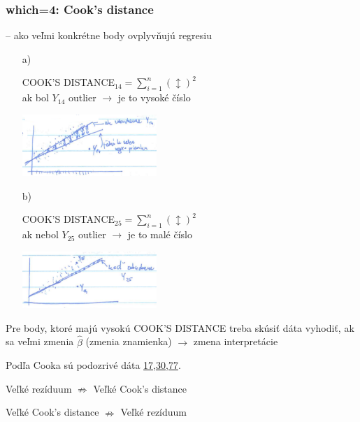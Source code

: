 \documentclass[unknownkeysallowed]{article}
\begin{document}
\subsubsection*{which=4: Cook's distance}
-- ako veľmi konkrétne body ovplyvňujú regresiu
\begin{itemize}
\item[a)]
\begin{multicols}{2}

COOK'S DISTANCE$_{14} = \sum_{i=1}^n(\updownarrow)^2$\\
ak bol $Y_{14}$ outlier $\to$ je to vysoké číslo

\columnbreak

\includegraphics[width=0.4\textwidth]{imgs/obr37.png}

\end{multicols}

\item[b)]
\begin{multicols}{2}

COOK'S DISTANCE$_{25} = \sum_{i=1}^n(\updownarrow)^2$\\
ak nebol $Y_{25}$ outlier $\to$ je to malé číslo

\columnbreak

\includegraphics[width=0.4\textwidth]{imgs/obr38.png}

\end{multicols}

\end{itemize}

Pre body, ktoré majú vysokú COOK'S DISTANCE treba skúsiť dáta vyhodiť, ak sa veľmi zmenia $\hat{\beta}$ (zmenia znamienka) $\to$ zmena interpretácie

Podľa Cooka sú podozrivé dáta \underline{17,30,77}.

\vspace{5mm}
Veľké rezíduum $\nRightarrow$ Veľké Cook's distance

Veľké Cook's distance $\nRightarrow$ Veľké rezíduum
\end{document}
